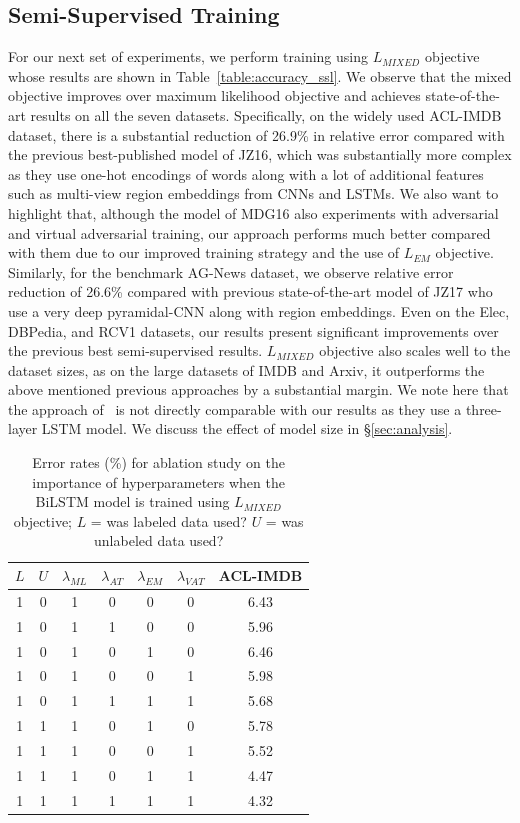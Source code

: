 \documentclass[letterpaper]{article}
\newcommand{\citet}[1]{\citeauthor{#1} \shortcite{#1}}
\begin{document}
\subsection{Semi-Supervised Training}
For our next set of experiments, we perform training using $L_{\textit{MIXED}}$ objective whose results are shown in Table~\ref{table:accuracy_ssl}. We observe that the mixed objective improves over maximum likelihood objective and achieves state-of-the-art results on all the seven datasets. Specifically, on the widely used ACL-IMDB dataset, there is a substantial reduction of 26.9\% in relative error compared with the previous best-published model of JZ16, which was substantially more complex as they use one-hot encodings of words along with a lot of additional features such as multi-view region embeddings from CNNs and LSTMs. We also want to highlight that, although the model of MDG16 also experiments with adversarial and virtual adversarial training, our approach performs much better compared with them due to our improved training strategy and the use of $L_{\textit{EM}}$ objective. Similarly, for the benchmark AG-News dataset, we observe relative error reduction of 26.6\% compared with previous state-of-the-art model of JZ17 who use a very deep pyramidal-CNN along with region embeddings. Even on the Elec, DBPedia, and RCV1 datasets, our results present significant improvements over the previous best semi-supervised results. $L_{\textit{MIXED}}$ objective also scales well to the dataset sizes, as on the large datasets of IMDB and Arxiv, it outperforms the above mentioned previous approaches by a substantial margin. We note here that the approach of~\citet{howard2018universal} is not directly comparable with our results as they use a three-layer LSTM model. We discuss the effect of model size in \S\ref{sec:analysis}.

\begin{table}[t]
\small
\centering
\begin{tabular}{@{} c c c c c c | c @{}}
\toprule
$L$ & $U$ & $\lambda_{\textit{ML}}$ & $\lambda_{\textit{AT}}$ & $\lambda_{\textit{EM}}$ & $\lambda_{\textit{VAT}}$ & ACL-IMDB \\
\midrule
1 & 0 & 1 & 0 & 0 & 0 & 6.43 \\
1 & 0 & 1 & 1 & 0 & 0 & 5.96 \\
1 & 0 & 1 & 0 & 1 & 0 & 6.46 \\
1 & 0 & 1 & 0 & 0 & 1 & 5.98 \\
1 & 0 & 1 & 1 & 1 & 1 & 5.68 \\
\midrule
1 & 1 & 1 & 0 & 1 & 0 & 5.78 \\
1 & 1 & 1 & 0 & 0 & 1 & 5.52 \\
1 & 1 & 1 & 0 & 1 & 1 & 4.47 \\
1 & 1 & 1 & 1 & 1 & 1 & 4.32 \\
\bottomrule
\end{tabular}
\caption{Error rates (\%) for ablation study on the importance of hyperparameters when the BiLSTM model is trained using $L_{\textit{MIXED}}$ objective; $L$ = was labeled data used? $U$ = was unlabeled data used?}
\label{table:ablation_unsup}
\end{table}
\end{document}
